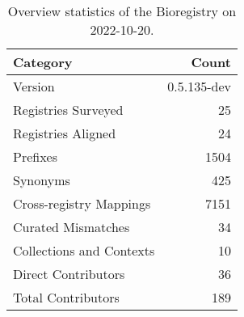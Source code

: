 \begin{table}
\centering
\caption{Overview statistics of the Bioregistry on 2022-10-20.}
\label{tab:bioregistry-summary}
\begin{tabular}{lr}
\toprule
                Category &       Count \\
\midrule
                 Version & 0.5.135-dev \\
     Registries Surveyed &          25 \\
      Registries Aligned &          24 \\
                Prefixes &        1504 \\
                Synonyms &         425 \\
 Cross-registry Mappings &        7151 \\
      Curated Mismatches &          34 \\
Collections and Contexts &          10 \\
     Direct Contributors &          36 \\
      Total Contributors &         189 \\
\bottomrule
\end{tabular}
\end{table}
